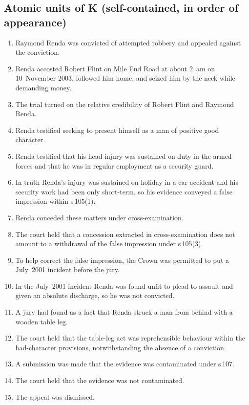 \documentclass[11pt]{article}
\begin{document}
\subsection*{Atomic units of K (self-contained, in order of appearance)}
\begin{enumerate}[label=\textbf{K\arabic*.},leftmargin=*]
  \item Raymond Renda was convicted of attempted robbery and appealed against the conviction.
  \item Renda accosted Robert Flint on Mile End Road at about 2~am on 10~November 2003, followed him home, and seized him by the neck while demanding money.
  \item The trial turned on the relative credibility of Robert Flint and Raymond Renda.
  \item Renda testified seeking to present himself as a man of positive good character.
  \item Renda testified that his head injury was sustained on duty in the armed forces and that he was in regular employment as a security guard.
  \item In truth Renda's injury was sustained on holiday in a car accident and his security work had been only short-term, so his evidence conveyed a false impression within s\,105(1).
  \item Renda conceded these matters under cross-examination.
  \item The court held that a concession extracted in cross-examination does not amount to a withdrawal of the false impression under s\,105(3).
  \item To help correct the false impression, the Crown was permitted to put a July~2001 incident before the jury.
  \item In the July~2001 incident Renda was found unfit to plead to assault and given an absolute discharge, so he was not convicted.
  \item A jury had found as a fact that Renda struck a man from behind with a wooden table leg.
  \item The court held that the table-leg act was reprehensible behaviour within the bad-character provisions, notwithstanding the absence of a conviction.
  \item A submission was made that the evidence was contaminated under s\,107.
  \item The court held that the evidence was not contaminated.
  \item The appeal was dismissed.
\end{enumerate}
\end{document}
